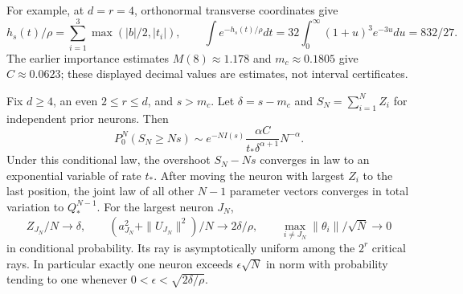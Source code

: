 For example, at $d=r=4$, orthonormal transverse coordinates give
\[
 h_s(t)/\rho=\sum_{i=1}^3\max(|b|/2,|t_i|),\qquad
 \int e^{-h_s(t)/\rho}dt
       =32\int_0^\infty(1+u)^3e^{-3u}du=832/27.
\]
The earlier importance estimates $M(8)\approx1.178$ and
$m_c\approx0.1805$ give $C\approx0.0623$; these displayed decimal
values are estimates, not interval certificates.

\begin{theorem}\label{thm:scalar}
Fix $d\ge4$, an even $2\le r\le d$, and $s>m_c$. Let
$\delta=s-m_c$ and $S_N=\sum_{i=1}^N Z_i$ for independent prior
neurons. Then
\[
 P_0^N(S_N\ge Ns)
 \sim e^{-NI(s)}\frac{\alpha C}{t_*\delta^{\alpha+1}}N^{-\alpha}.
 \tag{13}
\]
Under this conditional law, the overshoot $S_N-Ns$ converges in
law to an exponential variable of rate $t_*$. After moving the neuron
with largest $Z_i$ to the last position, the joint law of all other
$N-1$ parameter vectors converges in total variation to $Q_*^{N-1}$.
For the largest neuron $J_N$,
\[
 Z_{J_N}/N\to\delta,\qquad
 (a_{J_N}^2+\|U_{J_N}\|^2)/N\to2\delta/\rho,
 \qquad \max_{i\ne J_N}\|\theta_i\|/\sqrt N\to0
 \tag{14}
\]
in conditional probability. Its ray is asymptotically uniform among
the $2^r$ critical rays. In particular exactly one neuron exceeds
$\epsilon\sqrt N$ in norm with probability tending to one whenever
$0<\epsilon<\sqrt{2\delta/\rho}$.
\end{theorem}
